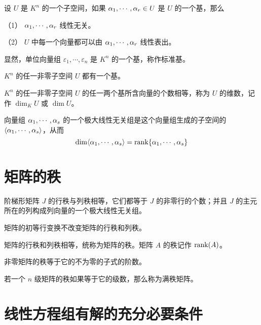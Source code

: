 \begin{definition}[子空间]
	设 $U$ 是 $K^n$ 的一个子空间，如果 $\alpha_1,\cdots,\alpha_r\in U$ 是 $U$ 的一个基，那么

	（1） $\alpha_1,\cdots,\alpha_r$ 线性无关。

	（2） $U$ 中每一个向量都可以由 $\alpha_1,\cdots,\alpha_r$ 线性表出。
\end{definition}

显然，单位向量组 $\varepsilon_1,\cdots,\varepsilon_n$ 是 $K^n$ 的一个基，称作标准基。

\begin{theorem}
	$K^n$ 的任一非零子空间 $U$ 都有一个基。
\end{theorem}

\begin{theorem}
	$K^n$ 的任一非零子空间 $U$ 的任一两个基所含向量的个数相等，称为 $U$ 的维数，记作 $\dim_KU$ 或 $\dim U$。
\end{theorem}

\begin{theorem}
	向量组 $\alpha_1,\cdots,\alpha_s$ 的一个极大线性无关组是这个向量组生成的子空间的 $\langle \alpha_1,\cdots,\alpha_s \rangle$，从而
	\[\dim\langle \alpha_1,\cdots,\alpha_s \rangle = \operatorname{rank}\{\alpha_1,\cdots,\alpha_s\}\]
\end{theorem}

\section{矩阵的秩}

\begin{theorem}
	阶梯形矩阵 $J$ 的行秩与列秩相等，它们都等于 $J$ 的非零行的个数；并且 $J$ 的主元所在的列构成列向量的一个极大线性无关组。
\end{theorem}

\begin{theorem}
	矩阵的初等行变换不改变矩阵的行秩和列秩。
\end{theorem}

\begin{theorem}
	矩阵的行秩和列秩相等，统称为矩阵的秩。矩阵 $A$ 的秩记作 $\operatorname{rank}(A)$。
\end{theorem}

\begin{theorem}
	非零矩阵的秩等于它的不为零的子式的阶数。
\end{theorem}

若一个 $n$ 级矩阵的秩如果等于它的级数，那么称为满秩矩阵。

\section{线性方程组有解的充分必要条件}

